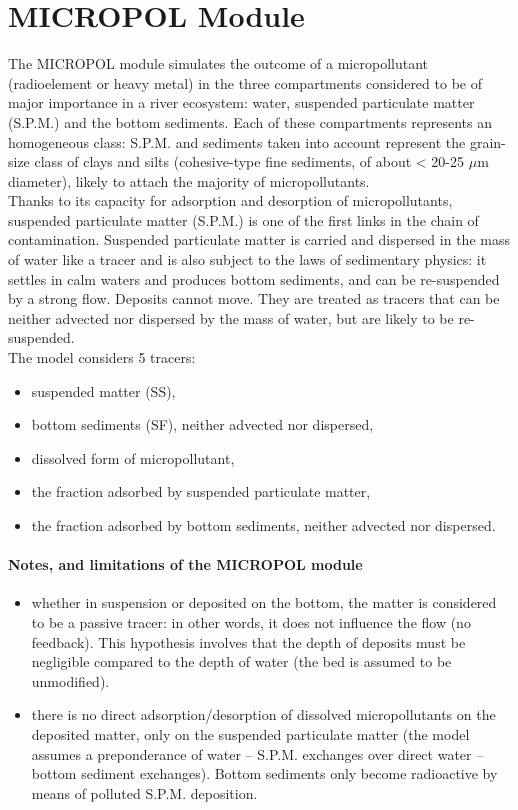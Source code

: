 \chapter{MICROPOL Module}

The MICROPOL module simulates the outcome of a micropollutant (radioelement or heavy metal)
in the three compartments considered to be of major importance in a river ecosystem:
water, suspended particulate matter (S.P.M.) and the bottom sediments.
Each of these compartments represents an homogeneous class:
S.P.M. and sediments taken into account represent the grain-size class of clays and silts
(cohesive-type fine sediments, of about < 20-25 $\mu$m diameter),
likely to attach the majority of micropollutants.\\

Thanks to its capacity for adsorption and desorption of micropollutants,
suspended particulate matter (S.P.M.) is one of the first links in the chain of contamination.
Suspended particulate matter is carried and dispersed in the mass of water
like a tracer and is also subject to the laws of sedimentary physics:
it settles in calm waters and produces bottom sediments,
and can be re-suspended by a strong flow.
Deposits cannot move. They are treated as tracers that can be neither advected
nor dispersed by the mass of water, but are likely to be re-suspended.\\

The model considers 5 tracers:

\begin{itemize}
\item suspended matter (SS),
\item bottom sediments (SF), neither advected nor dispersed,
\item dissolved form of micropollutant,
\item the fraction adsorbed by suspended particulate matter,
\item the fraction adsorbed by bottom sediments, neither advected nor dispersed.
\end{itemize}

\subsubsection{Notes, and limitations of the MICROPOL module}

\begin{itemize}
\item whether in suspension or deposited on the bottom, the matter is considered
  to be a passive tracer:
  in other words, it does not influence the flow (no feedback).
  This hypothesis involves that the depth of deposits must be negligible compared
  to the depth of water (the bed is assumed to be unmodified).
\item there is no direct adsorption/desorption of dissolved micropollutants
  on the deposited matter, only on the suspended particulate matter
  (the model assumes a preponderance of water – S.P.M. exchanges over direct water
  – bottom sediment exchanges).
  Bottom sediments only become radioactive by means of polluted S.P.M. deposition. 
\end{itemize}

